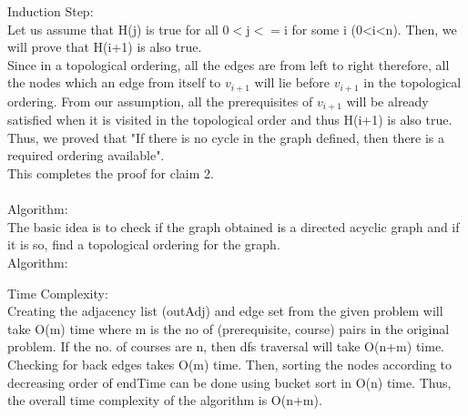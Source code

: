 \documentclass{article}
\begin{document}
Induction Step:\\
Let us assume that H(j) is true for all 0$<$j$<=$i for some i (0<i<n). Then, we will prove that H(i+1) is also true.\\
Since in a topological ordering, all the edges are from left to right therefore, all the nodes which an edge from itself to $v_{i+1}$ will lie before $v_{i+1}$ in the topological ordering. From our assumption, all the prerequisites of $v_{i+1}$ will be already satisfied when it is visited in the topological order and thus H(i+1) is also true.
\\
Thus, we proved that "If there is no cycle in the graph defined, then there is a required ordering available".
\\
This completes the proof for claim 2.\\
\\
Algorithm:\\
The basic idea is to check if the graph obtained is a directed acyclic graph and if it is so, find a topological ordering for the graph.\\
Algorithm:


Time Complexity:\\
Creating the adjacency list (outAdj) and edge set from the given problem will take O(m) time where m is the no of (prerequisite, course) pairs in the original problem. If the no. of courses are n, then dfs traversal will take O(n+m) time. Checking for back edges takes O(m) time. Then, sorting the nodes according to decreasing order of endTime can be done using bucket sort in O(n) time. Thus, the overall time complexity of the algorithm is O(n+m).
\end{document}
